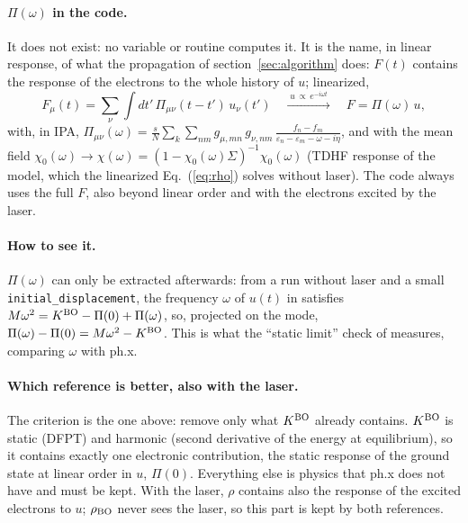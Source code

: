 \documentclass[11pt]{article}
\newcommand{\KBO}{K^{\rm BO}}
\newcommand{\rBO}{\rho_{\rm BO}}
\begin{document}
\paragraph{$\Pi(\omega)$ in the code.} It does not exist: no variable or routine computes it. It is the name, in
linear response, of what the propagation of section~\ref{sec:algorithm} does: $F(t)$ contains the response of the
electrons to the whole history of $u$; linearized,
\begin{equation}
F_\mu(t) = \sum_\nu\int dt'\,\Pi_{\mu\nu}(t-t')\,u_\nu(t') \quad\xrightarrow{\;u\,\propto\, e^{-i\omega t}\;}\quad
F = \Pi(\omega)\,u ,
\end{equation}
with, in IPA,
$\Pi_{\mu\nu}(\omega) = \frac{s}{N}\sum_k\sum_{nm} g_{\mu,mn}\,g_{\nu,nm}\,\frac{f_n-f_m}{\varepsilon_n-\varepsilon_m-\omega-i\eta}$,
and with the mean field $\chi_0(\omega)\to\chi(\omega) = (1-\chi_0(\omega)\Sigma)^{-1}\chi_0(\omega)$ (TDHF response of
the model, which the linearized Eq.~(\ref{eq:rho}) solves without laser). The code always uses the full $F$, also
beyond linear order and with the electrons excited by the laser.

\paragraph{How to see it.} $\Pi(\omega)$ can only be extracted afterwards: from a run without laser and a small
\texttt{initial\_displacement}, the frequency $\omega$ of $u(t)$ in  satisfies
$M\omega^2 = \KBO-\Pi(0)+\Pi(\omega)$, so, projected on the mode, $\Pi(\omega)-\Pi(0) = M\omega^2-\KBO$. This is
what the ``static limit'' check of  measures, comparing $\omega$ with ph.x.

\paragraph{Which reference is better, also with the laser.} The criterion is the one above: remove only what $\KBO$
already contains. $\KBO$ is static (DFPT) and harmonic (second derivative of the energy at equilibrium), so it
contains exactly one electronic contribution, the static response of the ground state at linear order in $u$,
$\Pi(0)$. Everything else is physics that ph.x does not have and must be kept. With the laser, $\rho$ contains also the
response of the excited electrons to $u$; $\rBO$ never sees the laser, so this part is kept by both references.
\end{document}
